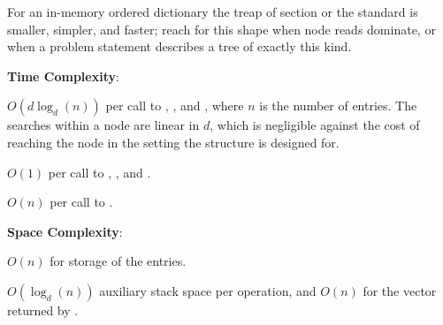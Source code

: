 For an in-memory ordered dictionary the treap of section  or the standard  is smaller, simpler, and faster; reach for this shape when node reads dominate, or when a problem statement describes a tree of exactly this kind.

\textbf{Time Complexity}:
\begin{compactitem}
  \item $O(d \log_{d}\left(n\right))$ per call to , , and , where $n$ is the number of entries. The searches within a node are linear in $d$, which is negligible against the cost of reaching the node in the setting the structure is designed for.
  \item $O(1)$ per call to , , and .
  \item $O(n)$ per call to .
\end{compactitem}

\textbf{Space Complexity}:
\begin{compactitem}
  \item $O(n)$ for storage of the entries.
  \item $O(\log_{d}\left(n\right))$ auxiliary stack space per operation, and $O(n)$ for the vector returned by .
\end{compactitem}

